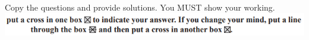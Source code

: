 \documentclass{article}
\date{}
\begin{document}
\fontsize{13}{15} \selectfont %

\begin{center}
  \qquad \\ 
\vspace{5pt}

\vspace{5pt}
    Copy the questions and provide solutions. You MUST show your working.  \\
\vspace{5pt}
    \includegraphics[width=15cm]{Year_6_Mixed_Tests/Xx.png}
\end{center}
\end{document}
